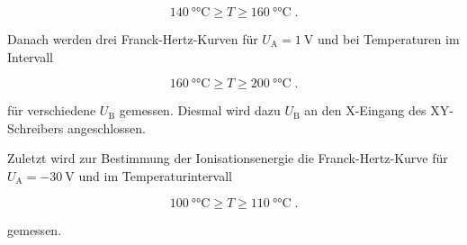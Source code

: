 \begin{equation*}
    \SI{140}{\degree\celsius} \geq T \geq \SI{160}{\degree\celsius} \; .
\end{equation*}

Danach werden drei Franck-Hertz-Kurven für $U_\text{A} =\SI{1}{\volt}$ und bei Temperaturen im Intervall

\begin{equation*}
    \SI{160}{\degree\celsius} \geq T \geq \SI{200}{\degree\celsius} \; .
\end{equation*}

für verschiedene $U_\text{B}$ gemessen.
Diesmal wird dazu $U_\text{B}$ an den X-Eingang des XY-Schreibers angeschlossen.

Zuletzt wird zur Bestimmung der Ionisationsenergie die Franck-Hertz-Kurve für $U_\text{A} = \SI{-30}{\volt}$
und im Temperaturintervall 

\begin{equation*}
    \SI{100}{\degree\celsius} \geq T \geq \SI{110}{\degree\celsius} \; .
\end{equation*}

gemessen.
